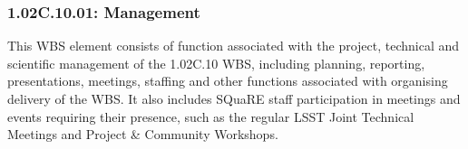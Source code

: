 \subsubsection*{1.02C.10.01: Management}

This WBS element consists of function associated with the project, technical
and scientific management of the 1.02C.10 WBS, including planning, reporting,
presentations, meetings, staffing and other functions associated with
organising delivery of the WBS. It also includes SQuaRE staff participation in
meetings and events requiring their presence, such as the regular LSST Joint
Technical Meetings and Project \& Community Workshops.

